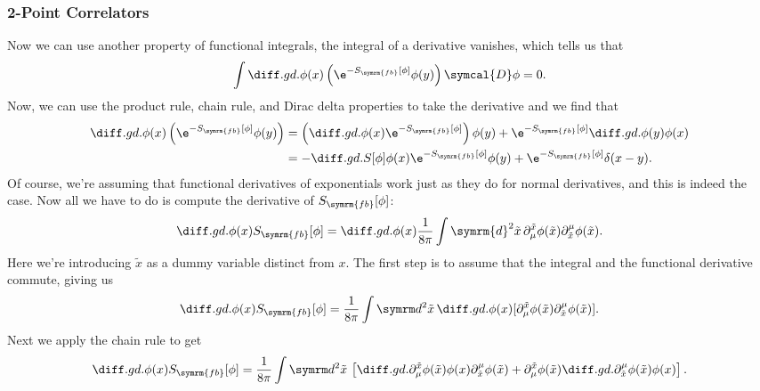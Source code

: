\documentclass[fleqn]{NotesClass}
\renewcommand{\dl}[1]{\symrm{d}#1}
\newcommand{\DL}{\symcal{D}}
\newcommand{\freeboson}{\symrm{fb}}
\begin{document}
    \subsubsection{2-Point Correlators}
    Now we can use another property of functional integrals, the integral of a derivative vanishes, which tells us that
    \begin{equation}
        \label{eqn:free boson 2-correlator step 1}
        \int \diffd{}{\phi(x)} \left( \e^{-S_{\freeboson}[\phi]}\phi(y) \right) \DL\phi = 0.
    \end{equation}
    Now, we can use the product rule, chain rule, and Dirac delta properties to take the derivative and we find that
    \begin{align}
        \diffd{}{\phi(x)} \left( \e^{-S_{\freeboson}[\phi]} \phi(y) \right) &= \left( \diffd{}{\phi(x)} \e^{-S_{\freeboson}[\phi]} \right) \phi(y) + \e^{-S_{\freeboson}[\phi]} \diffd{\phi(y)}{\phi(x)}\\
        &= -\diffd{S[\phi]}{\phi(x)} \e^{-S_{\freeboson}[\phi]} \phi(y) + \e^{-S_{\freeboson}[\phi]} \delta(x - y).
    \end{align}
    Of course, we're assuming that functional derivatives of exponentials work just as they do for normal derivatives, and this is indeed the case.
    Now all we have to do is compute the derivative of \(S_{\freeboson}[\phi]\):
    \begin{equation}
        \diffd{}{\phi(x)} S_{\freeboson}[\phi] = \diffd{}{\phi(x)} \frac{1}{8\pi} \int \dl{^2\tilde{x}} \, \partial_\mu^{\tilde{x}} \phi(\tilde{x}) \partial^\mu_{\tilde{x}} \phi(\tilde{x}).
    \end{equation}
    Here we're introducing \(\tilde{x}\) as a dummy variable distinct from \(x\).
    The first step is to assume that the integral and the functional derivative commute, giving us
    \begin{equation}
        \diffd{}{\phi(x)} S_{\freeboson}[\phi] = \frac{1}{8\pi} \int \dl^2\tilde{x} \, \diffd{}{\phi(x)} [\partial_\mu^{\tilde{x}} \phi(\tilde{x}) \partial^\mu_{\tilde{x}} \phi(\tilde{x})].
    \end{equation}
    Next we apply the chain rule to get
    \begin{equation}
        \diffd{}{\phi(x)} S_{\freeboson}[\phi] = \frac{1}{8\pi} \int \dl^2\tilde{x} \, \left[ \diffd{\partial_\mu^{\tilde{x}} \phi(\tilde{x})}{\phi(x)} \partial^\mu_{\tilde{x}}\phi(\tilde{x}) + \partial_\mu^{\tilde{x}}\phi(\tilde{x}) \diffd{\partial^\mu_{\tilde{x}}\phi(\tilde{x})}{\phi(x)} \right].
    \end{equation}
\end{document}
